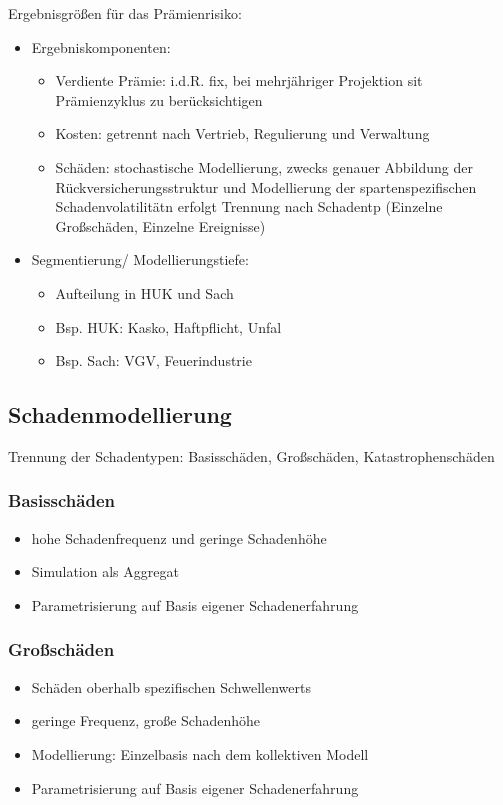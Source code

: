 \documentclass[12pt]{report}
\theoremstyle{dotless}
\theoremstyle{definition}
\begin{document}
Ergebnisgrößen für das Prämienrisiko:
\begin{itemize}
\item Ergebniskomponenten:
\begin{itemize}
\item Verdiente Prämie: i.d.R. fix, bei mehrjähriger Projektion sit Prämienzyklus zu berücksichtigen
\item Kosten: getrennt nach Vertrieb, Regulierung und Verwaltung
\item Schäden: stochastische Modellierung, zwecks genauer Abbildung der Rückversicherungsstruktur und Modellierung der spartenspezifischen Schadenvolatilitätn erfolgt Trennung nach Schadentp (Einzelne Großschäden, Einzelne Ereignisse)
\end{itemize}
\item Segmentierung/ Modellierungstiefe: 
\begin{itemize}
\item Aufteilung in HUK und Sach
\item Bsp. HUK: Kasko, Haftpflicht, Unfal
\item Bsp. Sach: VGV, Feuerindustrie
\end{itemize}
\end{itemize}

\subsection{Schadenmodellierung}
Trennung der Schadentypen: Basisschäden, Großschäden, Katastrophenschäden

\subsubsection{Basisschäden}
\begin{itemize}
\item hohe Schadenfrequenz und geringe Schadenhöhe
\item Simulation als Aggregat
\item Parametrisierung auf Basis eigener Schadenerfahrung
\end{itemize}

\subsubsection{Großschäden}
\begin{itemize}
\item Schäden oberhalb spezifischen Schwellenwerts
\item geringe Frequenz, große Schadenhöhe
\item Modellierung: Einzelbasis nach dem kollektiven Modell
\item Parametrisierung auf Basis eigener Schadenerfahrung
\end{itemize}
\end{document}
